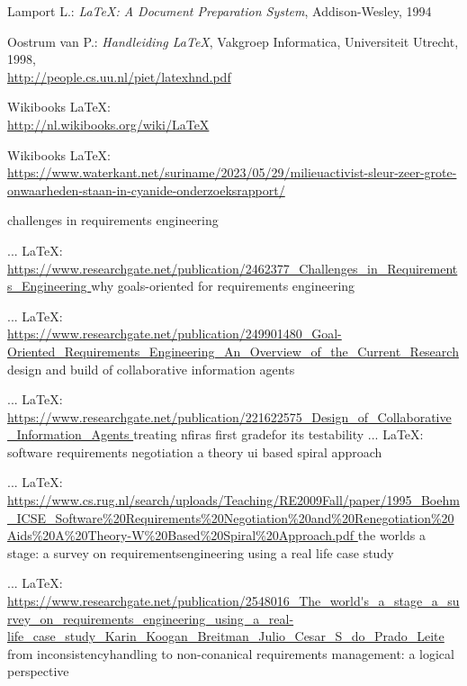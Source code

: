 
\begin{thebibliography}{99}


 Lamport L.: \emph{\LaTeX: A Document Preparation System}, Addison-Wesley, 1994 

 Oostrum van P.: \emph{Handleiding \LaTeX}, Vakgroep
Informatica, Universiteit Utrecht, 1998,\\ 
\url{http://people.cs.uu.nl/piet/latexhnd.pdf}

 Wikibooks \LaTeX:\\
\url{http://nl.wikibooks.org/wiki/LaTeX}


 Wikibooks \LaTeX:\\
\url{https://www.waterkant.net/suriname/2023/05/29/milieuactivist-sleur-zeer-grote-onwaarheden-staan-in-cyanide-onderzoeksrapport/}



challenges in requirements engineering

 ... \LaTeX:\\ \url{https://www.researchgate.net/publication/2462377_Challenges_in_Requirements_Engineering }
why goals-oriented for requirements engineering

 ... \LaTeX:\\ \url{https://www.researchgate.net/publication/249901480_Goal-Oriented_Requirements_Engineering_An_Overview_of_the_Current_Research }
design and build of collaborative information agents

 ... \LaTeX:\\ \url{https://www.researchgate.net/publication/221622575_Design_of_Collaborative_Information_Agents }
treating nfiras first gradefor its testability
\bibitem{ } ... \LaTeX:\\ \url{ }
software requirements negotiation a theory ui based spiral approach

 ... \LaTeX:\\ \url{https://www.cs.rug.nl/search/uploads/Teaching/RE2009Fall/paper/1995_Boehm_ICSE_Software%20Requirements%20Negotiation%20and%20Renegotiation%20Aids%20A%20Theory-W%20Based%20Spiral%20Approach.pdf }
the worlds a stage: a survey on requirementsengineering using a real life case study

 ... \LaTeX:\\ \url{https://www.researchgate.net/publication/2548016_The_world's_a_stage_a_survey_on_requirements_engineering_using_a_real-life_case_study_Karin_Koogan_Breitman_Julio_Cesar_S_do_Prado_Leite }
from inconsistencyhandling to non-conanical requirements management: a logical perspective


\end{thebibliography}
